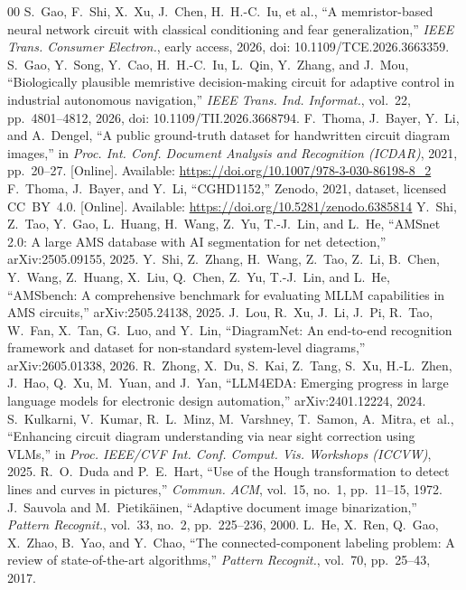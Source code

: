 \documentclass[journal]{IEEEtran}
\begin{document}
\begin{thebibliography}{00}
 S.~Gao, F.~Shi, X.~Xu, J.~Chen, H.~H.-C.~Iu, et al., ``A memristor-based neural network circuit with classical conditioning and fear generalization,'' \textit{IEEE Trans. Consumer Electron.}, early access, 2026, doi: 10.1109/TCE.2026.3663359.
 S.~Gao, Y.~Song, Y.~Cao, H.~H.-C.~Iu, L.~Qin, Y.~Zhang, and J.~Mou, ``Biologically plausible memristive decision-making circuit for adaptive control in industrial autonomous navigation,'' \textit{IEEE Trans. Ind. Informat.}, vol.~22, pp.~4801--4812, 2026, doi: 10.1109/TII.2026.3668794.
 F.~Thoma, J.~Bayer, Y.~Li, and A.~Dengel, ``A public ground-truth dataset for handwritten circuit diagram images,'' in \textit{Proc. Int. Conf. Document Analysis and Recognition (ICDAR)}, 2021, pp.~20--27. [Online]. Available: \url{https://doi.org/10.1007/978-3-030-86198-8_2}
 F.~Thoma, J.~Bayer, and Y.~Li, ``CGHD1152,'' Zenodo, 2021, dataset, licensed CC~BY~4.0. [Online]. Available: \url{https://doi.org/10.5281/zenodo.6385814}
 Y.~Shi, Z.~Tao, Y.~Gao, L.~Huang, H.~Wang, Z.~Yu, T.-J.~Lin, and L.~He, ``AMSnet 2.0: A large AMS database with AI segmentation for net detection,'' arXiv:2505.09155, 2025.
 Y.~Shi, Z.~Zhang, H.~Wang, Z.~Tao, Z.~Li, B.~Chen, Y.~Wang, Z.~Huang, X.~Liu, Q.~Chen, Z.~Yu, T.-J.~Lin, and L.~He, ``AMSbench: A comprehensive benchmark for evaluating MLLM capabilities in AMS circuits,'' arXiv:2505.24138, 2025.
 J.~Lou, R.~Xu, J.~Li, J.~Pi, R.~Tao, W.~Fan, X.~Tan, G.~Luo, and Y.~Lin, ``DiagramNet: An end-to-end recognition framework and dataset for non-standard system-level diagrams,'' arXiv:2605.01338, 2026.
 R.~Zhong, X.~Du, S.~Kai, Z.~Tang, S.~Xu, H.-L.~Zhen, J.~Hao, Q.~Xu, M.~Yuan, and J.~Yan, ``LLM4EDA: Emerging progress in large language models for electronic design automation,'' arXiv:2401.12224, 2024.
 S.~Kulkarni, V.~Kumar, R.~L.~Minz, M.~Varshney, T.~Samon, A.~Mitra, et~al., ``Enhancing circuit diagram understanding via near sight correction using VLMs,'' in \textit{Proc. IEEE/CVF Int. Conf. Comput. Vis. Workshops (ICCVW)}, 2025.
 R.~O.~Duda and P.~E.~Hart, ``Use of the Hough transformation to detect lines and curves in pictures,'' \textit{Commun. ACM}, vol.~15, no.~1, pp.~11--15, 1972.
 J.~Sauvola and M.~Pietik\"{a}inen, ``Adaptive document image binarization,'' \textit{Pattern Recognit.}, vol.~33, no.~2, pp.~225--236, 2000.
 L.~He, X.~Ren, Q.~Gao, X.~Zhao, B.~Yao, and Y.~Chao, ``The connected-component labeling problem: A review of state-of-the-art algorithms,'' \textit{Pattern Recognit.}, vol.~70, pp.~25--43, 2017.

\end{thebibliography}
\end{document}
